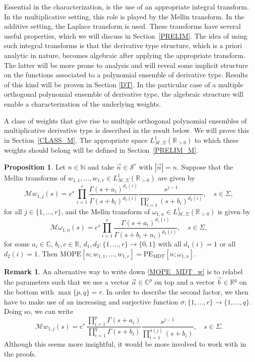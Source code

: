 \documentclass[a4paper,12pt,oneside]{article}
\theoremstyle{definition}
\newtheorem{prop}[defi]{Proposition}
\newtheorem{rem}[defi]{Remark}
\newcommand{\N}{\mathbb{N}}
\newcommand{\C}{\mathbb{C}}
\newcommand{\R}{\mathbb{R}}
\newcommand{\om}{\omega}
\newcommand{\sz}[1]{\left| \vec{#1} \right|}
\newcommand{\MT}[1]{\mathcal{M}#1}
\begin{document}
Essential in the characterization, is the use of an appropriate integral transform. In the multiplicative setting, this role is played by the Mellin transform. In the additive setting, the Laplace transform is used. These transforms have several useful properties, which we will discuss in Section~\ref{PRELIM}. The idea of using such integral transforms is that the derivative type structure, which is a priori analytic in nature, becomes algebraic after applying the appropriate transform. The latter will be more prone to analysis and will reveal some implicit structure on the functions associated to a polynomial ensemble of derivative type. Results of this kind will be proven in Section \ref{DT}. In the particular case of a multiple orthogonal polynomial ensemble of derivative type, the algebraic structure will enable a characterization of the underlying weights.
\medbreak

A class of weights that give rise to multiple orthogonal polynomial ensembles of multiplicative derivative type is described in the result below. We will prove this in Section~\ref{CLASS_M}. The appropriate space $L^1_{\MT{},\Sigma}(\R_{>0})$ to which these weights should belong will be defined in Section~\ref{PRELIM_M}.

\begin{prop} \label{MOPE_MDT_w_om}
Let $n\in\N$ and take $\vec{n}\in\mathcal{S}^r$ with $\sz{n}=n$. Suppose that the Mellin transforms of $w_{1,1},\dots,w_{1,r}\in L^{1}_{\MT{},\Sigma}(\R_{>0})$ are given by
\begin{equation} \label{MOPE_MDT_w}
        \MT{w_{1,j}}(s) = c^s \, \prod_{i=1}^r \frac{\Gamma(s+a_i)^{d_1(i)}}{\Gamma(s+b_i)^{d_2(i)}} \frac{s^{j-1}}{\prod_{i=1}^j (s+b_i)^{d_2(i)}}, \quad s\in\Sigma,
\end{equation}
for all $j\in\{1,\dots,r\}$, and the Mellin transform of $\om_{1,n}\in L^{1}_{\MT{},\Sigma}(\R_{>0})$ is given by
\begin{equation} \label{MOPE_MDT_om}
    \MT{\om}_{1,n}(s) = c^s \prod_{i=1}^{r} \frac{\Gamma(s+a_i)^{d_1(i)}}{\Gamma(s+b_i+n_i)^{d_2(i)}},\quad s\in\Sigma,
\end{equation}
for some $a_i\in\C$, $b_i,c\in\R$, $d_1,d_2:\{1,\dots,r\}\to\{0,1\}$ with all $d_1(i)=1$ or all $d_2(i)=1$. Then $\text{MOPE}[n;w_{1,1},\dots,w_{1,r}]=\text{PE}_{\text{MDT}}[n;\om_{1,n}]$.
\end{prop}
\begin{rem} \label{MDT_MR_ALT}
    An alternative way to write down \eqref{MOPE_MDT_w} is to relabel the parameters such that we use a vector $\vec{a}\in\C^p$ on top and a vector $\vec{b}\in\R^q$ on the bottom with $\max\{p,q\}=r$. In order to describe the second factor, we then have to make use of an increasing and surjective function $\sigma:\{1,\dots,r\}\to\{1,\dots,q\}$. Doing so, we can write    
        $$\MT{w_{1,j}}(s) = c^s \,  \frac{\prod_{i=1}^p \Gamma(s+a_i)}{\prod_{i=1}^q \Gamma(s+b_i)} \frac{s^{j-1}}{\prod_{i=1}^{\sigma(j)} (s+b_i)}, \quad s\in\Sigma.$$
    Although this seems more insightful, it would be more involved to work with in the proofs.
\end{rem}
\end{document}
